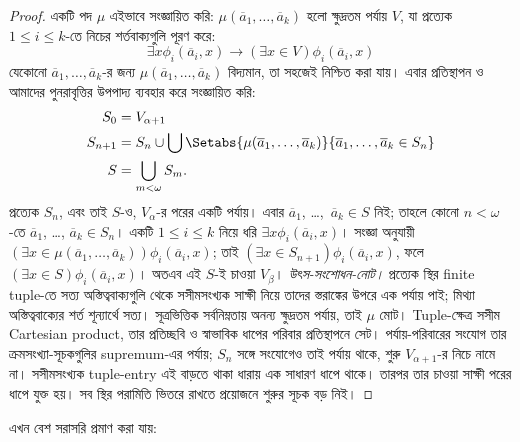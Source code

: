 \documentclass[../../../include/open-logic-section]{subfiles}
\begin{document}
\begin{proof}
একটি পদ $\mu$ এইভাবে সংজ্ঞায়িত করি:
$\mu(\overline{a}_1, \ldots,
\overline{a}_k)$ হলো ক্ষুদ্রতম পর্যায়
$V$, যা প্রত্যেক $1 \leq i \leq k$-তে
নিচের শর্তবাক্যগুলি পূরণ করে:
\[
\exists x\phi_i(\overline{a}_i, x) \rightarrow (\exists x \in V) \phi_i(\overline{a}_i, x)
\]
যেকোনো $\overline{a}_1, \ldots,
\overline{a}_k$-র জন্য
$\mu(\overline{a}_1, \ldots, \overline{a}_k)$
বিদ্যমান, তা সহজেই নিশ্চিত করা যায়।
এবার প্রতিস্থাপন ও আমাদের পুনরাবৃত্তির
উপপাদ্য ব্যবহার করে সংজ্ঞায়িত করি:
\begin{align*}
	S_0 & = V_{\alpha+1}\\
	S_{n+1} & = S_n \cup \bigcup
	\Setabs{\mu(\overline{a}_1, \ldots, \overline{a}_k)}
	{\overline{a}_1, \ldots, \overline{a}_k \in S_n} \\
	S &= \bigcup_{m < \omega} S_m.
\end{align*}
প্রত্যেক $S_n$, এবং তাই $S$-ও,
$V_\alpha$-র পরের একটি পর্যায়।
এবার $\overline{a}_1$, \dots,~$\overline{a}_k
\in S$ নিই; তাহলে কোনো $n < \omega$-তে
$\overline{a}_1$, \dots, $\overline{a}_k
\in S_n$। একটি $1 \leq i \leq k$
নিয়ে ধরি $\exists x
\phi_i(\overline{a}_i,x)$। সংজ্ঞা অনুযায়ী
$(\exists x \in \mu(\overline{a}_1,
\ldots, \overline{a}_k))\phi_i(\overline{a}_i, x)$;
তাই $(\exists x \in S_{n+1})\phi_i(\overline{a}_i, x)$,
ফলে $(\exists x \in S)\phi_i(\overline{a}_i, x)$।
অতএব এই $S$-ই চাওয়া $V_\beta$।
\emph{উৎস-সংশোধন-নোট।} প্রত্যেক স্থির finite tuple-তে সত্য
অস্তিত্ববাক্যগুলি থেকে সসীমসংখ্যক সাক্ষী নিয়ে তাদের স্তরাঙ্কের
উপরে এক পর্যায় পাই; মিথ্যা অস্তিত্ববাক্যের শর্ত শূন্যার্থে সত্য।
সূত্রভিত্তিক সর্বনিম্নতায় অনন্য ক্ষুদ্রতম পর্যায়, তাই $\mu$
মোট। Tuple-ক্ষেত্র সসীম Cartesian product, তার প্রতিচ্ছবি ও
স্বাভাবিক ধাপের পরিবার প্রতিস্থাপনে সেট। পর্যায়-পরিবারের সংযোগ
তার ক্রমসংখ্যা-সূচকগুলির supremum-এর পর্যায়; $S_n$ সঙ্গে
সংযোগেও তাই পর্যায় থাকে, শুরু $V_{\alpha+1}$-র নিচে নামে না।
সসীমসংখ্যক tuple-entry এই বাড়তে থাকা ধারায় এক সাধারণ
ধাপে থাকে। তারপর তার চাওয়া সাক্ষী পরের ধাপে যুক্ত হয়।
সব স্থির পরামিতি ভিতরে রাখতে প্রয়োজনে শুরুর সূচক বড় নিই।
\end{proof}
\noindent
এখন 
বেশ সরাসরি প্রমাণ করা যায়:
\end{document}
